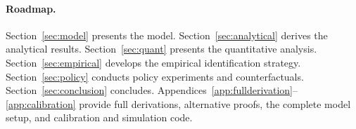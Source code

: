 \paragraph{Roadmap.}
Section~\ref{sec:model} presents the model. Section~\ref{sec:analytical} derives
the analytical results. Section~\ref{sec:quant} presents the quantitative
analysis. Section~\ref{sec:empirical} develops the empirical identification
strategy. Section~\ref{sec:policy} conducts policy experiments and
counterfactuals. Section~\ref{sec:conclusion} concludes.
Appendices~\ref{app:fullderivation}--\ref{app:calibration} provide full
derivations, alternative proofs, the complete model setup, and calibration and
simulation code.
